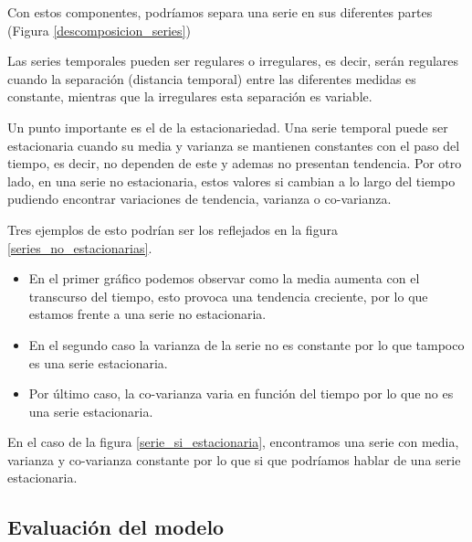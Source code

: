 Con estos componentes, podríamos separa una serie en sus diferentes partes (Figura \ref{descomposicion_series})
\label{descomposicion_series}

Las series temporales pueden ser regulares o irregulares, es decir, serán regulares cuando la separación (distancia temporal) entre las diferentes medidas es constante, mientras que la irregulares esta separación es variable.

Un punto importante es el de la estacionariedad. Una serie temporal puede ser estacionaria cuando su media y varianza se mantienen constantes con el paso del tiempo, es decir, no dependen de este y ademas no presentan tendencia. Por otro lado, en una serie no estacionaria, estos valores si cambian a lo largo del tiempo pudiendo encontrar variaciones de tendencia, varianza o co-varianza.

Tres ejemplos de esto podrían ser los reflejados en la figura \ref{series_no_estacionarias}.

\label{series_no_estacionarias}

\begin{itemize}
	\item En el primer gráfico podemos observar como la media aumenta con el transcurso del tiempo, esto provoca una tendencia creciente, por lo que estamos frente a una serie no estacionaria.
	\item En el segundo caso la varianza de la serie no es constante por lo que tampoco es una serie estacionaria.
	\item Por último caso, la co-varianza varia en función del tiempo por lo que no es una serie estacionaria. 
\end{itemize}

\label{serie_si_estacionaria}

En el caso de la figura \ref{serie_si_estacionaria}, encontramos una serie con media, varianza y co-varianza constante por lo que si que podríamos hablar de una serie estacionaria. 

\subsection{Evaluación del modelo}



